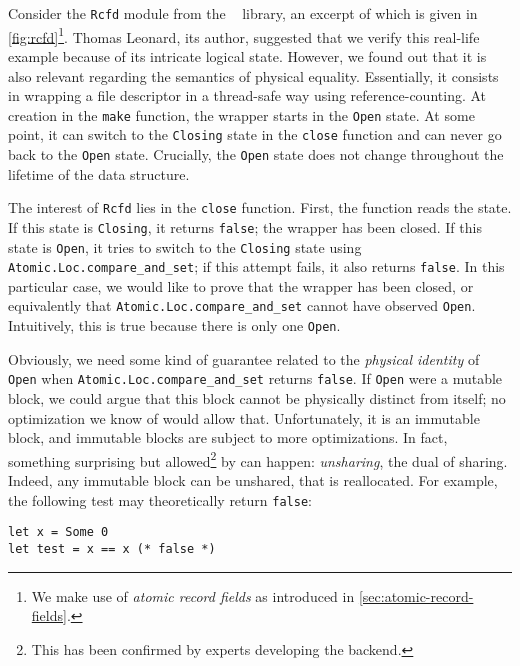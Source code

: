 Consider the \texttt{Rcfd} module from the \Eio~\cite{eio} library, an excerpt of which is given in \cref{fig:rcfd}\footnote{We make use of \emph{atomic record fields} as introduced in \cref{sec:atomic-record-fields}.}.
Thomas Leonard, its author, suggested that we verify this real-life example because of its intricate logical state.
However, we found out that it is also relevant regarding the semantics of physical equality.
Essentially, it consists in wrapping a file descriptor in a thread-safe way using reference-counting.
At creation in the \texttt{make} function, the wrapper starts in the \texttt{Open} state.
At some point, it can switch to the \texttt{Closing} state in the \texttt{close} function and can never go back to the \texttt{Open} state.
Crucially, the \texttt{Open} state does not change throughout the lifetime of the data structure.

The interest of \texttt{Rcfd} lies in the \texttt{close} function.
First, the function reads the state.
If this state is \texttt{Closing}, it returns \texttt{false}; the wrapper has been closed.
If this state is \texttt{Open}, it tries to switch to the \texttt{Closing} state using \texttt{Atomic.Loc.compare_and_set}; if this attempt fails, it also returns \texttt{false}.
In this particular case, we would like to prove that the wrapper has been closed, or equivalently that \texttt{Atomic.Loc.compare_and_set} cannot have observed \texttt{Open}.
Intuitively, this is true because there is only one \texttt{Open}.

Obviously, we need some kind of guarantee related to the \emph{physical identity} of \texttt{Open} when \texttt{Atomic.Loc.compare_and_set} returns \texttt{false}.
If \texttt{Open} were a mutable block, we could argue that this block cannot be physically distinct from itself; no optimization we know of would allow that.
Unfortunately, it is an immutable block, and immutable blocks are subject to more optimizations.
In fact, something surprising but allowed\footnote{This has been confirmed by \OCaml experts developing the \Flambda backend.} by \OCaml can happen: \emph{unsharing}, the dual of sharing.
Indeed, any immutable block can be unshared, that is reallocated.
For example, the following test may theoretically return \texttt{false}:
\begin{verbatim}
let x = Some 0
let test = x == x (* false *)
\end{verbatim}

